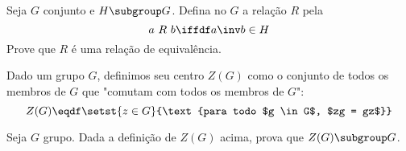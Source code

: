 \begin{exercise}
    Seja $G$ conjunto e $H \subgroup G$. Defina no $G$ a relação $R$ pela
    $$
    a\ R\ b \iffdf a \inv b \in H
    $$
    Prove que $R$ é uma relação de equivalência.
\end{exercise}

\begin{definition}
    Dado um grupo $G$, definimos seu centro $Z(G)$ como o conjunto de todos os
    membros de $G$ que "comutam com todos os membros de $G$":
    $$
    Z(G) \eqdf \setst{z \in G}{\text{para todo $g \in G$, $zg = gz$}}
    $$
\end{definition}

\begin{exercise}
    Seja $G$ grupo. Dada a definição de $Z(G)$ acima, prova que $Z(G) \subgroup
    G$.
\end{exercise}
